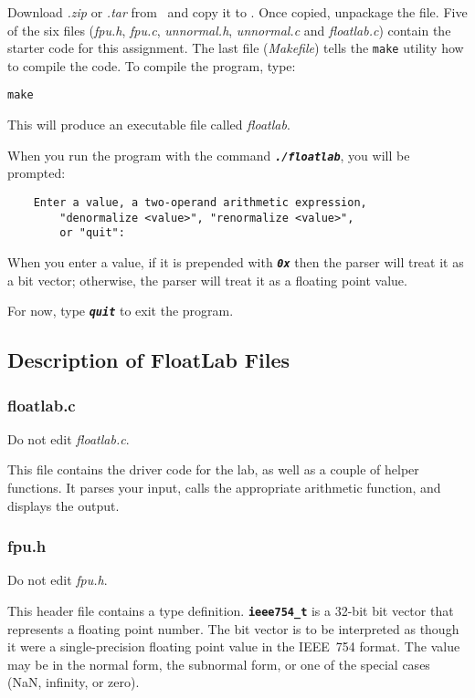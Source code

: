 Download \textit{\shortlabname.zip} or \textit{\shortlabname.tar} from \filesource\ and copy it to \runtimeenvironment.
Once copied, unpackage the file.
Five of the six files (\textit{fpu.h}, \textit{fpu.c}, \textit{unnormal.h}, \textit{unnormal.c} and \textit{floatlab.c}) contain the starter code for this assignment.
The last file (\textit{Makefile}) tells the \texttt{make} utility how to compile the code.
To compile the program, type:

\texttt{make}

This will produce an executable file called \textit{floatlab}.

When you run the program with the command \texttt{\textbf{\textit{./floatlab}}}, you will be prompted:

\begin{verbatim}
    Enter a value, a two-operand arithmetic expression,
        "denormalize <value>", "renormalize <value>",
        or "quit":
\end{verbatim}

When you enter a value, if it is prepended with \texttt{\textbf{\textit{0x}}} then the parser will treat it as a bit vector;
otherwise, the parser will treat it as a floating point value.

For now, type \texttt{\textbf{\textit{quit}}} to exit the program.

\subsection{Description of FloatLab Files}

\subsubsection{floatlab.c}

Do not edit \textit{floatlab.c}.

This file contains the driver code for the lab, as well as a couple of helper functions.
It parses your input, calls the appropriate arithmetic function, and displays the output.

\subsubsection{fpu.h}\label{subsubsec:fpu.h}

Do not edit \textit{fpu.h}.

This header file contains a type definition.
\textbf{\texttt{ieee754\_t}} is a 32-bit bit vector that represents a floating point number.
The bit vector is to be interpreted as though it were a single-precision floating point value in the IEEE~754 format.
The value may be in the normal form, the subnormal form, or one of the special cases (NaN, infinity, or zero).

